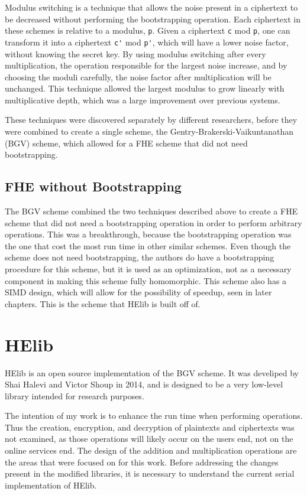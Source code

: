Modulus switching \cite{coron2012public} is a technique that allows the noise present in a ciphertext to be decreased without performing the bootstrapping operation. Each ciphertext in these schemes is relative to a modulus, \verb|p|. Given a ciphertext \verb|c| mod \verb|p|, one can transform it into a ciphertext \verb|c'| mod \verb|p'|, which will have a lower noise factor, without knowing the secret key. By using modulus switching after every multiplication, the operation responsible for the largest noise increase, and by choosing the moduli carefully, the noise factor after multiplication will be unchanged. This technique allowed the largest modulus to grow linearly with multiplicative depth, which was a large improvement over previous systems.

These techniques were discovered separately by different researchers, before they were combined to create a single scheme, the Gentry-Brakerski-Vaikuntanathan (BGV) scheme, which allowed for a FHE scheme that did not need bootstrapping.

\subsection{FHE without Bootstrapping}
The BGV scheme \cite{cryptoeprint:2011:277} combined the two techniques described above to create a FHE scheme that did not need a bootstrapping operation in order to perform arbitrary operations. This was a breakthrough, because the bootstrapping operation was the one that cost the most run time in other similar schemes. Even though the scheme does not need bootstrapping, the authors do have a bootstrapping procedure for this scheme, but it is used as an optimization, not as a necessary component in making this scheme fully homomorphic. This scheme also has a SIMD design, which will allow for the possibility of speedup, seen in later chapters. This is the scheme that HElib is built off of.

\section{HElib}
HElib \cite{cryptoeprint:2014:106} \cite{cryptoeprint:2014:873} \cite{halevi2013design} is an open source implementation of the BGV scheme. It was develiped by Shai Halevi and Victor Shoup in 2014, and is designed to be a very low-level library intended for research purposes. 

The intention of my work is to enhance the run time when performing operations. Thus the creation, encryption, and decryption of plaintexts and ciphertexts was not examined, as those operations will likely occur on the users end, not on the online services end. The design of the addition and multiplication operations are the areas that were focused on for this work. Before addressing the changes present in the modified libraries, it is necessary to understand the current serial implementation of HElib. 

